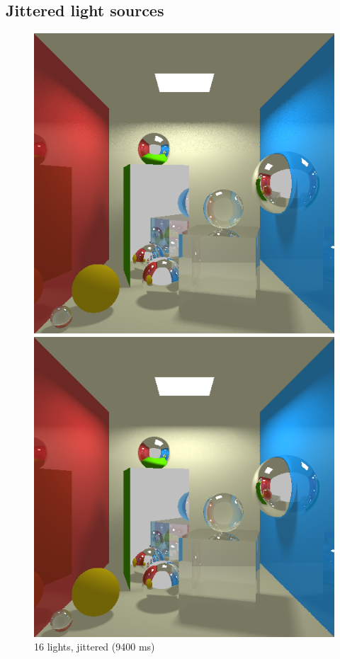 \subsection{Jittered light sources}
\begin{figure}[H]
    \centering
    \includegraphics[width=\linewidth]{img/shadows/16_jittered.png}
    \caption{16 lights, jittered (9400 ms)}
\endminipage\hfill
{}
    \centering
    \includegraphics[width=\linewidth]{img/shadows/64_jittered.png}

\end{figure}
